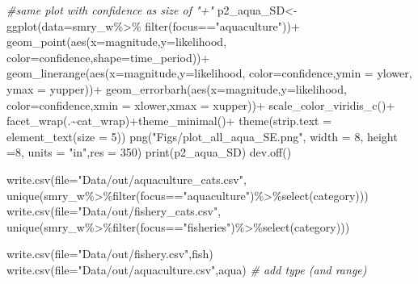 \documentclass[
]{article}
\newenvironment{Shaded}{\begin{snugshade}}{\end{snugshade}}
\newcommand{\AttributeTok}[1]{\textcolor[rgb]{0.77,0.63,0.00}{#1}}
\newcommand{\CommentTok}[1]{\textcolor[rgb]{0.56,0.35,0.01}{\textit{#1}}}
\newcommand{\DecValTok}[1]{\textcolor[rgb]{0.00,0.00,0.81}{#1}}
\newcommand{\FunctionTok}[1]{\textcolor[rgb]{0.00,0.00,0.00}{#1}}
\newcommand{\NormalTok}[1]{#1}
\newcommand{\OtherTok}[1]{\textcolor[rgb]{0.56,0.35,0.01}{#1}}
\newcommand{\SpecialCharTok}[1]{\textcolor[rgb]{0.00,0.00,0.00}{#1}}
\newcommand{\StringTok}[1]{\textcolor[rgb]{0.31,0.60,0.02}{#1}}
\begin{document}
\begin{Shaded}
\begin{Highlighting}[]
    \CommentTok{\#same plot with confidence as size of "+"}
\NormalTok{     p2\_aqua\_SD}\OtherTok{\textless{}{-}} \FunctionTok{ggplot}\NormalTok{(}\AttributeTok{data=}\NormalTok{smry\_w}\SpecialCharTok{\%\textgreater{}\%}
                           \FunctionTok{filter}\NormalTok{(focus}\SpecialCharTok{==}\StringTok{"aquaculture"}\NormalTok{))}\SpecialCharTok{+}
       \FunctionTok{geom\_point}\NormalTok{(}\FunctionTok{aes}\NormalTok{(}\AttributeTok{x=}\NormalTok{magnitude,}\AttributeTok{y=}\NormalTok{likelihood,}
                      \AttributeTok{color=}\NormalTok{confidence,}\AttributeTok{shape=}\NormalTok{time\_period))}\SpecialCharTok{+}
        \FunctionTok{geom\_linerange}\NormalTok{(}\FunctionTok{aes}\NormalTok{(}\AttributeTok{x=}\NormalTok{magnitude,}\AttributeTok{y=}\NormalTok{likelihood,}
                           \AttributeTok{color=}\NormalTok{confidence,}\AttributeTok{ymin =}\NormalTok{ ylower, }\AttributeTok{ymax =}\NormalTok{ yupper))}\SpecialCharTok{+}
       \FunctionTok{geom\_errorbarh}\NormalTok{(}\FunctionTok{aes}\NormalTok{(}\AttributeTok{x=}\NormalTok{magnitude,}\AttributeTok{y=}\NormalTok{likelihood,}
                          \AttributeTok{color=}\NormalTok{confidence,}\AttributeTok{xmin =}\NormalTok{ xlower,}\AttributeTok{xmax =}\NormalTok{ xupper))}\SpecialCharTok{+}
      \FunctionTok{scale\_color\_viridis\_c}\NormalTok{()}\SpecialCharTok{+}
      \FunctionTok{facet\_wrap}\NormalTok{(.}\SpecialCharTok{\textasciitilde{}}\NormalTok{cat\_wrap)}\SpecialCharTok{+}\FunctionTok{theme\_minimal}\NormalTok{()}\SpecialCharTok{+} 
       \FunctionTok{theme}\NormalTok{(}\AttributeTok{strip.text =} \FunctionTok{element\_text}\NormalTok{(}\AttributeTok{size =} \DecValTok{5}\NormalTok{))}
    \FunctionTok{png}\NormalTok{(}\StringTok{"Figs/plot\_all\_aqua\_SE.png"}\NormalTok{, }
        \AttributeTok{width =} \DecValTok{8}\NormalTok{, }\AttributeTok{height =}\DecValTok{8}\NormalTok{, }\AttributeTok{units =} \StringTok{"in"}\NormalTok{,}\AttributeTok{res =} \DecValTok{350}\NormalTok{)}
    \FunctionTok{print}\NormalTok{(p2\_aqua\_SD)}
    \FunctionTok{dev.off}\NormalTok{()}
    
    \FunctionTok{write.csv}\NormalTok{(}\AttributeTok{file=}\StringTok{"Data/out/aquaculture\_cats.csv"}\NormalTok{,}
              \FunctionTok{unique}\NormalTok{(smry\_w}\SpecialCharTok{\%\textgreater{}\%}\FunctionTok{filter}\NormalTok{(focus}\SpecialCharTok{==}\StringTok{"aquaculture"}\NormalTok{)}\SpecialCharTok{\%\textgreater{}\%}\FunctionTok{select}\NormalTok{(category)))}
    \FunctionTok{write.csv}\NormalTok{(}\AttributeTok{file=}\StringTok{"Data/out/fishery\_cats.csv"}\NormalTok{,}
              \FunctionTok{unique}\NormalTok{(smry\_w}\SpecialCharTok{\%\textgreater{}\%}\FunctionTok{filter}\NormalTok{(focus}\SpecialCharTok{==}\StringTok{"fisheries"}\NormalTok{)}\SpecialCharTok{\%\textgreater{}\%}\FunctionTok{select}\NormalTok{(category)))}
   
   \FunctionTok{write.csv}\NormalTok{(}\AttributeTok{file=}\StringTok{"Data/out/fishery.csv"}\NormalTok{,fish)}
   \FunctionTok{write.csv}\NormalTok{(}\AttributeTok{file=}\StringTok{"Data/out/aquaculture.csv"}\NormalTok{,aqua)}
   \CommentTok{\# add type (and range)}
\end{Highlighting}
\end{Shaded}
\end{document}
